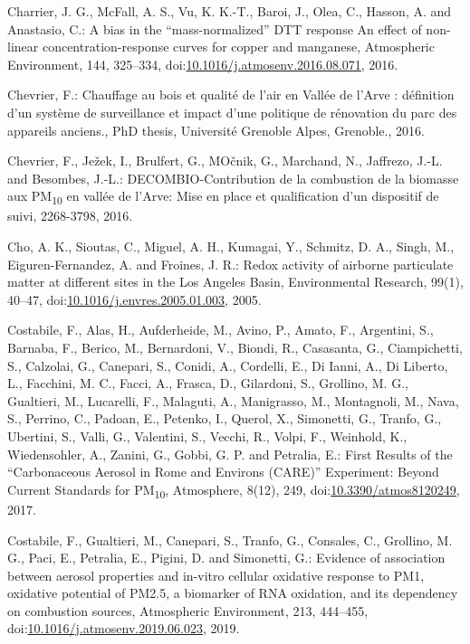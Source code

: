 \documentclass[
]{article}
\begin{document}
Charrier, J. G., McFall, A. S., Vu, K. K.-T., Baroi, J., Olea, C.,
Hasson, A. and Anastasio, C.: A bias in the ``mass-normalized'' DTT
response An effect of non-linear concentration-response curves for
copper and manganese, Atmospheric Environment, 144, 325--334,
doi:\href{https://doi.org/10.1016/j.atmosenv.2016.08.071}{10.1016/j.atmosenv.2016.08.071},
2016.

Chevrier, F.: Chauffage au bois et qualité de l'air en Vallée de l'Arve
: définition d'un système de surveillance et impact d'une politique de
rénovation du parc des appareils anciens., PhD thesis, Université
Grenoble Alpes, Grenoble., 2016.

Chevrier, F., Ježek, I., Brulfert, G., MOčnik, G., Marchand, N.,
Jaffrezo, J.-L. and Besombes, J.-L.: DECOMBIO-Contribution de la
combustion de la biomasse aux PM\textsubscript{10} en vallée de l'Arve:
Mise en place et qualification d'un dispositif de suivi, 2268-3798,
2016.

Cho, A. K., Sioutas, C., Miguel, A. H., Kumagai, Y., Schmitz, D. A.,
Singh, M., Eiguren-Fernandez, A. and Froines, J. R.: Redox activity of
airborne particulate matter at different sites in the Los Angeles Basin,
Environmental Research, 99(1), 40--47,
doi:\href{https://doi.org/10.1016/j.envres.2005.01.003}{10.1016/j.envres.2005.01.003},
2005.

Costabile, F., Alas, H., Aufderheide, M., Avino, P., Amato, F.,
Argentini, S., Barnaba, F., Berico, M., Bernardoni, V., Biondi, R.,
Casasanta, G., Ciampichetti, S., Calzolai, G., Canepari, S., Conidi, A.,
Cordelli, E., Di Ianni, A., Di Liberto, L., Facchini, M. C., Facci, A.,
Frasca, D., Gilardoni, S., Grollino, M. G., Gualtieri, M., Lucarelli,
F., Malaguti, A., Manigrasso, M., Montagnoli, M., Nava, S., Perrino, C.,
Padoan, E., Petenko, I., Querol, X., Simonetti, G., Tranfo, G.,
Ubertini, S., Valli, G., Valentini, S., Vecchi, R., Volpi, F., Weinhold,
K., Wiedensohler, A., Zanini, G., Gobbi, G. P. and Petralia, E.: First
Results of the ``Carbonaceous Aerosol in Rome and Environs (CARE)''
Experiment: Beyond Current Standards for PM\textsubscript{10},
Atmosphere, 8(12), 249,
doi:\href{https://doi.org/10.3390/atmos8120249}{10.3390/atmos8120249},
2017.

Costabile, F., Gualtieri, M., Canepari, S., Tranfo, G., Consales, C.,
Grollino, M. G., Paci, E., Petralia, E., Pigini, D. and Simonetti, G.:
Evidence of association between aerosol properties and in-vitro cellular
oxidative response to PM1, oxidative potential of PM2.5, a biomarker of
RNA oxidation, and its dependency on combustion sources, Atmospheric
Environment, 213, 444--455,
doi:\href{https://doi.org/10.1016/j.atmosenv.2019.06.023}{10.1016/j.atmosenv.2019.06.023},
2019.
\end{document}
